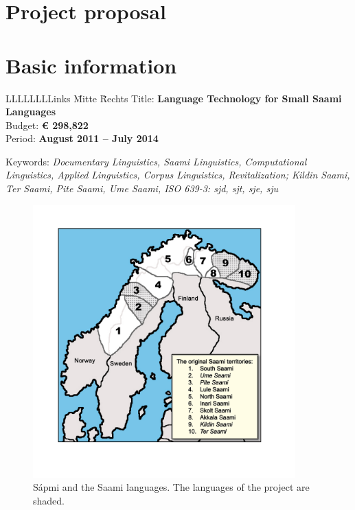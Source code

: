 \documentclass[a4paper,12pt]{article}
\begin{document}
\newpage

\section*{Project proposal}

\section{Basic information}

\begin{tabbing}
LLLLLLLLinks \= Mitte \= Rechts \kill
Title: \>\textbf{Language Technology for Small Saami Languages}\\
Budget: \>\textbf{€ 298,822}\\
Period: \>\textbf{August 2011 – July 2014}\\
\end{tabbing}
\begin{flushleft}
Keywords: {\it Documentary Linguistics, Saami Linguistics, Computational Linguistics, Applied Linguistics, Corpus Linguistics, Revitalization; Kildin Saami, Ter Saami, Pite Saami, Ume Saami, ISO 639-3: sjd, sjt, sje, sju}
\end{flushleft}

\begin{figure}[h]
\begin{center}
\caption{S\'{a}pmi and the Saami languages. The languages of the project are shaded.} 
\label{SaamiLgs}
\includegraphics[width=0.9\textwidth]{SaamiLgs.jpeg}
\end{center}
\end{figure}
\end{document}
